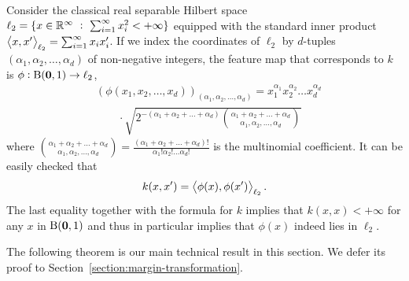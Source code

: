 Consider the classical real separable Hilbert space $\ell_2 = \{ x \in \mathbb{R}^\infty
~:~ \sum_{i=1}^\infty x_i^2 < + \infty \}$ equipped with the standard inner
product $\left\langle x, x' \right\rangle_{\ell_2} = \sum_{i=1}^\infty x_i x'_i$. If we index the
coordinates of $\ell_2$ by $d$-tuples $(\alpha_1, \alpha_2, \dots, \alpha_d)$ of
non-negative integers, the feature map that corresponds to $k$ is $\phi: \operatorname{B}(\mathbf{0},1)
\to \ell_2$,
\begin{align}
& \left(\phi(x_1, x_2, \dots, x_d)\right)_{(\alpha_1, \alpha_2, \dots, \alpha_d)} = x_1^{\alpha_1} x_2^{\alpha_2} \dots x_d^{\alpha_d} \nonumber \\
& \qquad \cdot \sqrt{2^{-(\alpha_1 + \alpha_2 + \dots + \alpha_d)} \binom{\alpha_1 + \alpha_2 + \dots + \alpha_d}{\alpha_1, \alpha_2, \dots, \alpha_d}}
\label{equation:phi}
\end{align}
where $\binom{\alpha_1 + \alpha_2 + \dots + \alpha_d}{\alpha_1, \alpha_2, \dots,
\alpha_d} = \frac{(\alpha_1 + \alpha_2 + \dots + \alpha_d)!}{\alpha_1! \alpha_2!
\dots \alpha_d!}$ is the multinomial coefficient. It can be easily checked that
$$
k(x,x') = \left\langle \phi(x), \phi(x') \right\rangle_{\ell_2}.
$$
The last equality together with the formula for $k$ implies that $k(x,x) <
+\infty$ for any $x$ in $\operatorname{B}(\mathbf{0},1)$ and thus in particular implies that $\phi(x)$
indeed lies in $\ell_2$.

The following theorem is our main technical result in this section. We defer its
proof to Section~\ref{section:margin-transformation}.

